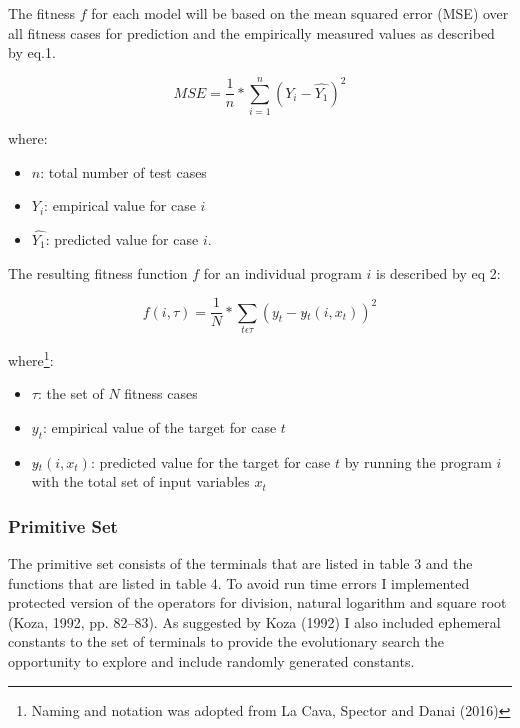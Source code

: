 \documentclass[
  12pt,
]{article}
\providecommand{\tightlist}{%
  \setlength{\itemsep}{0pt}\setlength{\parskip}{0pt}}
\begin{document}
The fitness \(f\) for each model will be based on the mean squared error
(MSE) over all fitness cases for prediction and the empirically measured
values as described by eq.1.

\begin{equation}
\tag{eq. 1}
MSE = \frac{1}{n} * \sum_{i=1}^{n} (Y_i - \hat{Y_1})^2
\end{equation}

where:

\begin{itemize}
\tightlist
\item
  \(n\): total number of test cases
\item
  \(Y_i\): empirical value for case \(i\)
\item
  \(\hat{Y_1}\): predicted value for case \(i\).
\end{itemize}

The resulting fitness function \(f\) for an individual program \(i\) is
described by eq 2:

\begin{equation}
\tag{eq. 2}
 f(i, \tau ) = \frac{1}{N} * \sum_{t \epsilon \tau} (y_t - y\hat{}_t(i, x_t))^2 
\end{equation}

where\footnote{Naming and notation was adopted from La Cava, Spector and
  Danai (2016)}:

\begin{itemize}
\tightlist
\item
  \(\tau\): the set of \(N\) fitness cases
\item
  \(y_t\): empirical value of the target for case \(t\)
\item
  \(y\hat{}_t(i, x_t)\): predicted value for the target for case \(t\)
  by running the program \(i\) with the total set of input variables
  \(x_t\)
\end{itemize}

\hypertarget{primitive-set}{%
\subsubsection{Primitive Set}\label{primitive-set}}

The primitive set consists of the terminals that are listed in table 3
and the functions that are listed in table 4. To avoid run time errors I
implemented protected version of the operators for division, natural
logarithm and square root (Koza, 1992, pp. 82--83). As suggested by Koza
(1992) I also included ephemeral constants to the set of terminals to
provide the evolutionary search the opportunity to explore and include
randomly generated constants.
\end{document}
